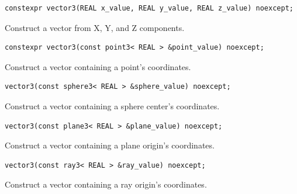 \par\noindent\begin{minipage}{\linewidth}
\begin{lstlisting}[style=apireference]
constexpr vector3(REAL x_value, REAL y_value, REAL z_value) noexcept;
\end{lstlisting}
{\footnotesize Construct a vector from X, Y, and Z components.\par}
\end{minipage}\par\vspace{1pt}
\par\noindent\begin{minipage}{\linewidth}
\begin{lstlisting}[style=apireference]
constexpr vector3(const point3< REAL > &point_value) noexcept;
\end{lstlisting}
{\footnotesize Construct a vector containing a point's coordinates.\par}
\end{minipage}\par\vspace{1pt}
\par\noindent\begin{minipage}{\linewidth}
\begin{lstlisting}[style=apireference]
vector3(const sphere3< REAL > &sphere_value) noexcept;
\end{lstlisting}
{\footnotesize Construct a vector containing a sphere center's coordinates.\par}
\end{minipage}\par\vspace{1pt}
\par\noindent\begin{minipage}{\linewidth}
\begin{lstlisting}[style=apireference]
vector3(const plane3< REAL > &plane_value) noexcept;
\end{lstlisting}
{\footnotesize Construct a vector containing a plane origin's coordinates.\par}
\end{minipage}\par\vspace{1pt}
\par\noindent\begin{minipage}{\linewidth}
\begin{lstlisting}[style=apireference]
vector3(const ray3< REAL > &ray_value) noexcept;
\end{lstlisting}
{\footnotesize Construct a vector containing a ray origin's coordinates.\par}
\end{minipage}\par\vspace{1pt}
